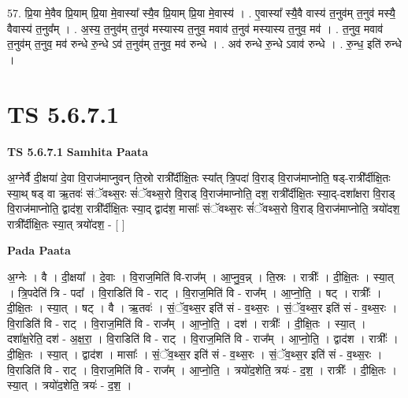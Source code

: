 \documentclass[17pt]{extarticle}
\begin{document}
57. प्रि॒या मे॒वैव प्रि॒याम् प्रि॒या मे॒वास्या᳚ स्यै॒व प्रि॒याम् प्रि॒या मे॒वास्य॑ । . ए॒वास्या᳚ स्यै॒वै वास्य॑ त॒नुव॑म् त॒नुव॑ मस्यै॒ वैवास्य॑ त॒नुव᳚म् । . अ॒स्य॒ त॒नुव॑म् त॒नुव॑ मस्यास्य त॒नुव॒ मवाव॑ त॒नुव॑ मस्यास्य त॒नुव॒ मव॑ । . त॒नुव॒ मवाव॑ त॒नुव॑म् त॒नुव॒ मव॑ रुन्धे रु॒न्धे ऽव॑ त॒नुव॑म् त॒नुव॒ मव॑ रुन्धे । . अव॑ रुन्धे रु॒न्धे ऽवाव॑ रुन्धे । . रु॒न्ध॒ इति॑ रुन्धे । \newline
\pagebreak
{}

\section{ TS 5.6.7.1 }

\textbf{TS 5.6.7.1 } \newline
\textbf{Samhita Paata} \newline

अ॒ग्नेर्वै दी॒क्षया॑ दे॒वा वि॒राज॑माप्नुवन् ति॒स्रो रात्री᳚र्दीक्षि॒तः स्या᳚त् त्रि॒पदा॑ वि॒राड् वि॒राज॑माप्नोति॒ षड्-रात्री᳚र्दीक्षि॒तः स्या॒थ् षड् वा ऋ॒तवः॑ संॅवथ्स॒रः सं॑ॅवथ्स॒रो वि॒राड् वि॒राज॑माप्नोति॒ दश॒ रात्री᳚र्दीक्षि॒तः स्या॒द्-दशा᳚क्षरा वि॒राड् वि॒राज॑माप्नोति॒ द्वाद॑श॒ रात्री᳚र्दीक्षि॒तः स्या॒द् द्वाद॑श॒ मासाः᳚ संॅवथ्स॒रः सं॑ॅवथ्स॒रो वि॒राड् वि॒राज॑माप्नोति॒ त्रयो॑दश॒ रात्री᳚र्दीक्षि॒तः स्या॒त् त्रयो॑दश॒ - [  ] \newline

\textbf{Pada Paata} \newline

अ॒ग्नेः । वै । दी॒क्षया᳚ । दे॒वाः । वि॒राज॒मिति॑ वि-राज᳚म् । आ॒प्नु॒व॒न्न् । ति॒स्रः । रात्रीः᳚ । दी॒क्षि॒तः । स्या॒त् । त्रि॒पदेति॑ त्रि - पदा᳚ । वि॒राडिति॑ वि - राट् । वि॒राज॒मिति॑ वि - राज᳚म् । आ॒प्नो॒ति॒ । षट् । रात्रीः᳚ । दी॒क्षि॒तः । स्या॒त् । षट् । वै । ऋ॒तवः॑ । सं॒ॅव॒थ्स॒र इति॑ सं - व॒थ्स॒रः । सं॒ॅव॒थ्स॒र इति॑ सं - व॒थ्स॒रः । वि॒राडिति॑ वि - राट् । वि॒राज॒मिति॑ वि - राज᳚म् । आ॒प्नो॒ति॒ । दश॑ । रात्रीः᳚ । दी॒क्षि॒तः । स्या॒त् । दशा᳚क्ष॒रेति॒ दश॑ - अ॒क्ष॒रा॒ । वि॒राडिति॑ वि - राट् । वि॒राज॒मिति॑ वि - राज᳚म् । आ॒प्नो॒ति॒ । द्वाद॑श । रात्रीः᳚ । दी॒क्षि॒तः । स्या॒त् । द्वाद॑श । मासाः᳚ । सं॒ॅव॒थ्स॒र इति॑ सं - व॒थ्स॒रः । सं॒ॅव॒थ्स॒र इति॑ सं - व॒थ्स॒रः । वि॒राडिति॑ वि - राट् । वि॒राज॒मिति॑ वि - राज᳚म् । आ॒प्नो॒ति॒ । त्रयो॑द॒शेति॒ त्रयः॑ - द॒श॒ । रात्रीः᳚ । दी॒क्षि॒तः । स्या॒त् । त्रयो॑द॒शेति॒ त्रयः॑ - द॒श॒ ।  \newline
\end{document}
